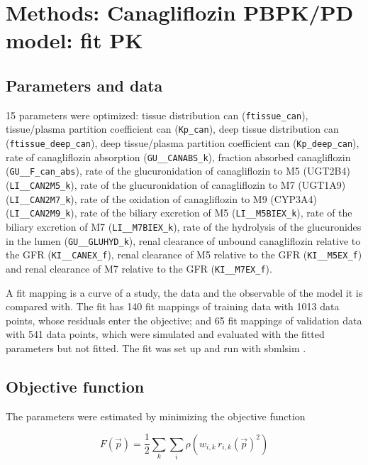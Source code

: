 \section{Methods: Canagliflozin PBPK/PD model: fit PK}

\subsection{Parameters and data}

15 parameters were optimized: tissue distribution can (\texttt{ftissue\_can}), tissue/plasma partition coefficient can (\texttt{Kp\_can}), deep tissue distribution can (\texttt{ftissue\_deep\_can}), deep tissue/plasma partition coefficient can (\texttt{Kp\_deep\_can}), rate of canagliflozin absorption (\texttt{GU\_\_CANABS\_k}), fraction absorbed canagliflozin (\texttt{GU\_\_F\_can\_abs}), rate of the glucuronidation of canagliflozin to M5 (UGT2B4) (\texttt{LI\_\_CAN2M5\_k}), rate of the glucuronidation of canagliflozin to M7 (UGT1A9) (\texttt{LI\_\_CAN2M7\_k}), rate of the oxidation of canagliflozin to M9 (CYP3A4) (\texttt{LI\_\_CAN2M9\_k}), rate of the biliary excretion of M5 (\texttt{LI\_\_M5BIEX\_k}), rate of the biliary excretion of M7 (\texttt{LI\_\_M7BIEX\_k}), rate of the hydrolysis of the glucuronides in the lumen (\texttt{GU\_\_GLUHYD\_k}), renal clearance of unbound canagliflozin relative to the GFR (\texttt{KI\_\_CANEX\_f}), renal clearance of M5 relative to the GFR (\texttt{KI\_\_M5EX\_f}) and renal clearance of M7 relative to the GFR (\texttt{KI\_\_M7EX\_f}).

A fit mapping is a curve of a study, the data and the observable of the model it is compared with. The fit has 140 fit mappings of training data with 1013 data points, whose residuals enter the objective; and 65 fit mappings of validation data with 541 data points, which were simulated and evaluated with the fitted parameters but not fitted. The fit was set up and run with sbmlsim \cite{Koenig2026_sbmlsim}.

\subsection{Objective function}

The parameters were estimated by minimizing the objective function

\begin{equation}
F(\vec{p}) = \frac{1}{2} \sum_{k} \sum_{i} \rho\left(w_{i,k}\, r_{i,k}(\vec{p})^2\right)
\end{equation}

